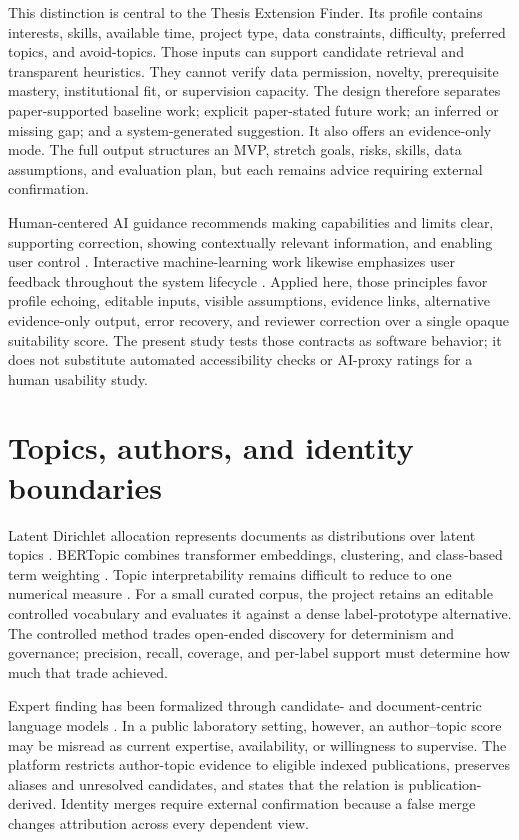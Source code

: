 This distinction is central to the Thesis Extension Finder. Its profile contains interests, skills, available time, project type, data constraints, difficulty, preferred topics, and avoid-topics. Those inputs can support candidate retrieval and transparent heuristics. They cannot verify data permission, novelty, prerequisite mastery, institutional fit, or supervision capacity. The design therefore separates paper-supported baseline work; explicit paper-stated future work; an inferred or missing gap; and a system-generated suggestion. It also offers an evidence-only mode. The full output structures an MVP, stretch goals, risks, skills, data assumptions, and evaluation plan, but each remains advice requiring external confirmation.

Human-centered AI guidance recommends making capabilities and limits clear, supporting correction, showing contextually relevant information, and enabling user control \cite{amershi2019guidelines}. Interactive machine-learning work likewise emphasizes user feedback throughout the system lifecycle \cite{amershi2014power}. Applied here, those principles favor profile echoing, editable inputs, visible assumptions, evidence links, alternative evidence-only output, error recovery, and reviewer correction over a single opaque suitability score. The present study tests those contracts as software behavior; it does not substitute automated accessibility checks or AI-proxy ratings for a human usability study.

\section{Topics, authors, and identity boundaries}

Latent Dirichlet allocation represents documents as distributions over latent topics \cite{blei2003lda}. BERTopic combines transformer embeddings, clustering, and class-based term weighting \cite{grootendorst2022bertopic}. Topic interpretability remains difficult to reduce to one numerical measure \cite{doogan2021topic}. For a small curated corpus, the project retains an editable controlled vocabulary and evaluates it against a dense label-prototype alternative. The controlled method trades open-ended discovery for determinism and governance; precision, recall, coverage, and per-label support must determine how much that trade achieved.

Expert finding has been formalized through candidate- and document-centric language models \cite{balog2006formal,balog2009language}. In a public laboratory setting, however, an author--topic score may be misread as current expertise, availability, or willingness to supervise. The platform restricts author-topic evidence to eligible indexed publications, preserves aliases and unresolved candidates, and states that the relation is publication-derived. Identity merges require external confirmation because a false merge changes attribution across every dependent view.

